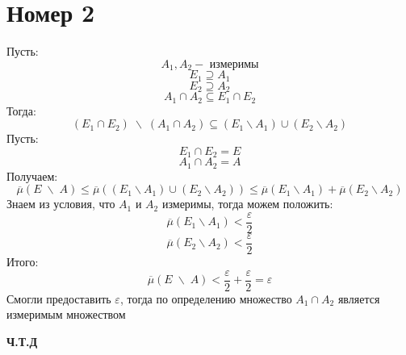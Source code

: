 \documentclass[a4paper,12pt]{article}
\begin{document}
\section*{Номер 2}
Пусть:
\[
A_1, A_2 - \text{ измеримы}
\]
\[
E_1 \supseteq A_1
\]
\[
E_2 \supseteq A_2
\]
\[
A_1 \cap A_2 \subseteq E_1 \cap E_2
\]
Тогда:
\[
(E_1 \cap E_2)\;  \backslash \; (A_1 \cap A_2) \subseteq (E_1 \backslash A_1) \cup (E_2 \backslash A_2) 
\]
Пусть:
\[
E_1 \cap E_2 = E
\]
\[
A_1 \cap A_2 = A
\]
Получаем:
\[
\overline{\mu} (E\; \backslash\; A) \leq \overline{\mu}\left((E_1 \backslash A_1) \cup (E_2 \backslash A_2) \right) \leq \overline{\mu} (E_1 \backslash A_1) +  \overline{\mu} (E_2 \backslash A_2) 
\]
Знаем из условия, что $A_1$ и $A_2$ измеримы, тогда можем положить:
\[
 \overline{\mu} (E_1 \backslash A_1)  < \frac{\varepsilon}{2}
\]
\[
\overline{\mu} (E_2 \backslash A_2)  < \frac{\varepsilon}{2}
\]
Итого:
\[
\overline{\mu} (E\; \backslash\; A)  < \frac{\varepsilon}{2} + \frac{\varepsilon}{2} = \varepsilon
\]
Смогли предоставить $\varepsilon$, тогда по определению множество $A_1 \cap A_2$ является измеримым множеством
\begin{center}
\textbf{Ч.Т.Д} 
\end{center}
\end{document}

